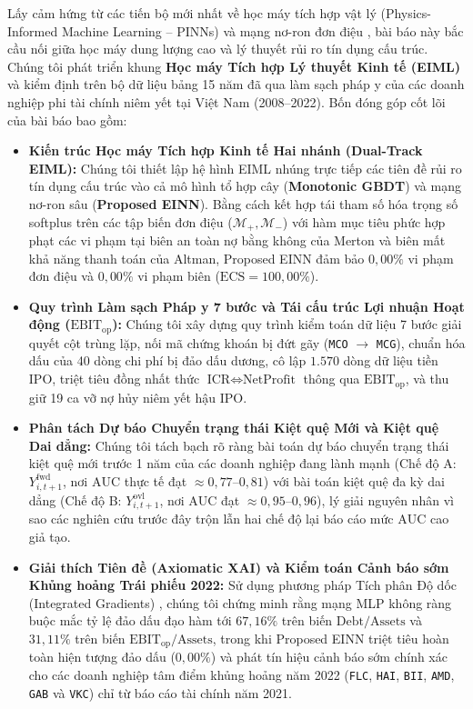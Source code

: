\documentclass[11pt,a4paper]{article}
\begin{document}
Lấy cảm hứng từ các tiến bộ mới nhất về học máy tích hợp vật lý (Physics-Informed Machine Learning -- PINNs) \citep{raissi2019physics,karniadakis2021physics} và mạng nơ-ron đơn điệu \citep{sill1997monotonic,you2017deep,runje2023constrained}, bài báo này bắc cầu nối giữa học máy dung lượng cao và lý thuyết rủi ro tín dụng cấu trúc. Chúng tôi phát triển khung \textbf{Học máy Tích hợp Lý thuyết Kinh tế (EIML)} và kiểm định trên bộ dữ liệu bảng 15 năm đã qua làm sạch pháp y của các doanh nghiệp phi tài chính niêm yết tại Việt Nam (2008--2022). Bốn đóng góp cốt lõi của bài báo bao gồm:
\begin{itemize}
    \item \textbf{Kiến trúc Học máy Tích hợp Kinh tế Hai nhánh (Dual-Track EIML):} Chúng tôi thiết lập hệ hình EIML nhúng trực tiếp các tiên đề rủi ro tín dụng cấu trúc vào cả mô hình tổ hợp cây (\textbf{Monotonic GBDT}) và mạng nơ-ron sâu (\textbf{Proposed EINN}). Bằng cách kết hợp tái tham số hóa trọng số softplus trên các tập biến đơn điệu ($\mathcal{M}_+, \mathcal{M}_-$) với hàm mục tiêu phức hợp phạt các vi phạm tại biên an toàn nợ bằng không của Merton và biên mất khả năng thanh toán của Altman, Proposed EINN đảm bảo $0,00\%$ vi phạm đơn điệu và $0,00\%$ vi phạm biên ($\text{ECS} = 100,00\%$).
    \item \textbf{Quy trình Làm sạch Pháp y 7 bước và Tái cấu trúc Lợi nhuận Hoạt động ($\text{EBIT}_{\text{op}}$):} Chúng tôi xây dựng quy trình kiểm toán dữ liệu 7 bước giải quyết cột trùng lặp, nối mã chứng khoán bị đứt gãy (\texttt{MCO} $\to$ \texttt{MCG}), chuẩn hóa dấu của 40 dòng chi phí bị đảo dấu dương, cô lập $1.570$ dòng dữ liệu tiền IPO, triệt tiêu đồng nhất thức $\text{ICR} \iff \text{NetProfit}$ thông qua $\text{EBIT}_{\text{op}}$, và thu giữ 19 ca vỡ nợ hủy niêm yết hậu IPO.
    \item \textbf{Phân tách Dự báo Chuyển trạng thái Kiệt quệ Mới và Kiệt quệ Dai dẳng:} Chúng tôi tách bạch rõ ràng bài toán dự báo chuyển trạng thái kiệt quệ mới trước 1 năm của các doanh nghiệp đang lành mạnh (Chế độ A: $Y_{i,t+1}^{\text{fwd}}$, nơi $\text{AUC}$ thực tế đạt $\approx 0,77\text{--}0,81$) với bài toán kiệt quệ đa kỳ dai dẳng (Chế độ B: $Y_{i,t+1}^{\text{ovl}}$, nơi $\text{AUC}$ đạt $\approx 0,95\text{--}0,96$), lý giải nguyên nhân vì sao các nghiên cứu trước đây trộn lẫn hai chế độ lại báo cáo mức $\text{AUC}$ cao giả tạo.
    \item \textbf{Giải thích Tiên đề (Axiomatic XAI) và Kiểm toán Cảnh báo sớm Khủng hoảng Trái phiếu 2022:} Sử dụng phương pháp Tích phân Độ dốc (Integrated Gradients) \citep{sundararajan2017axiomatic}, chúng tôi chứng minh rằng mạng MLP không ràng buộc mắc tỷ lệ đảo dấu đạo hàm tới $67,16\%$ trên biến $\text{Debt}/\text{Assets}$ và $31,11\%$ trên biến $\text{EBIT}_{\text{op}}/\text{Assets}$, trong khi Proposed EINN triệt tiêu hoàn toàn hiện tượng đảo dấu ($0,00\%$) và phát tín hiệu cảnh báo sớm chính xác cho các doanh nghiệp tâm điểm khủng hoảng năm 2022 (\texttt{FLC}, \texttt{HAI}, \texttt{BII}, \texttt{AMD}, \texttt{GAB} và \texttt{VKC}) chỉ từ báo cáo tài chính năm 2021.
\end{itemize}
\end{document}
